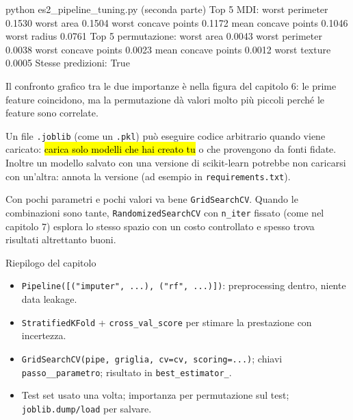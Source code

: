 \begin{terminale}{python es2_pipeline_tuning.py  (seconda parte)}
Top 5 MDI:
 worst perimeter         0.1530
worst area              0.1504
worst concave points    0.1172
mean concave points     0.1046
worst radius            0.0761
Top 5 permutazione:
 worst area              0.0043
worst perimeter         0.0038
worst concave points    0.0023
mean concave points     0.0012
worst texture           0.0005
Stesse predizioni: True
\end{terminale}

Il confronto grafico tra le due importanze è nella figura del capitolo 6: le prime feature coincidono, ma la permutazione dà valori molto più piccoli perché le feature sono correlate.

\begin{attenzione}
Un file \texttt{.joblib} (come un \texttt{.pkl}) può eseguire codice arbitrario quando viene caricato: \hl{carica solo modelli che hai creato tu} o che provengono da fonti fidate. Inoltre un modello salvato con una versione di scikit-learn potrebbe non caricarsi con un'altra: annota la versione (ad esempio in \texttt{requirements.txt}).
\end{attenzione}

\begin{consiglio}
Con pochi parametri e pochi valori va bene \texttt{GridSearchCV}. Quando le combinazioni sono tante, \texttt{RandomizedSearchCV} con \texttt{n\_iter} fissato (come nel capitolo 7) esplora lo stesso spazio con un costo controllato e spesso trova risultati altrettanto buoni.
\end{consiglio}

\begin{appunti}{Riepilogo del capitolo}
\begin{itemize}
  \item \texttt{Pipeline([("imputer", ...), ("rf", ...)])}: preprocessing dentro, niente data leakage.
  \item \texttt{StratifiedKFold} + \texttt{cross\_val\_score} per stimare la prestazione con incertezza.
  \item \texttt{GridSearchCV(pipe, griglia, cv=cv, scoring=...)}; chiavi \texttt{passo\_\_parametro}; risultato in \texttt{best\_estimator\_}.
  \item Test set usato una volta; importanza per permutazione sul test; \texttt{joblib.dump/load} per salvare.
\end{itemize}
\end{appunti}
